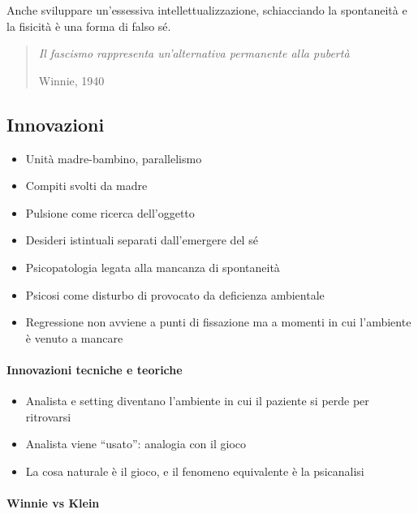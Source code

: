 \documentclass[12pt, a4paper]{article}
\begin{document}
Anche sviluppare un'essessiva intellettualizzazione, schiacciando la spontaneit\`a e la fisicit\`a \`e una forma di falso s\'e.

\begin{quote}
    \emph{Il fascismo rappresenta un'alternativa permanente alla pubert\`a}
    \begin{flushright}
        Winnie, 1940
    \end{flushright}
\end{quote}


\subsection{Innovazioni}

\begin{itemize}
    \item Unit\`a madre-bambino, parallelismo
    \item Compiti svolti da madre
    \item Pulsione come ricerca dell'oggetto
    \item Desideri istintuali separati dall'emergere del s\'e
    \item Psicopatologia legata alla mancanza di spontaneit\`a
    \item Psicosi come disturbo di provocato da deficienza ambientale
    \item Regressione non avviene a punti di fissazione ma a momenti in cui l'ambiente \`e venuto a mancare
\end{itemize}

\paragraph{Innovazioni tecniche e teoriche}

\begin{itemize}
    \item Analista e setting diventano l'ambiente in cui il paziente si perde per ritrovarsi
    \item Analista viene ``usato'': analogia con il gioco
    \item La cosa naturale \`e il gioco, e il fenomeno equivalente \`e la psicanalisi
\end{itemize} 

\paragraph{Winnie vs Klein}
\end{document}
